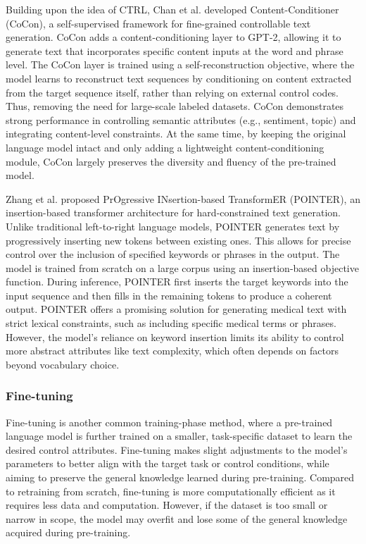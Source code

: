 Building upon the idea of CTRL, Chan et al. \cite{chan2022coconselfsupervisedapproachcontrolled} developed Content-Conditioner (CoCon), a self-supervised framework for fine-grained controllable text generation. 
CoCon adds a content-conditioning layer to GPT-2, allowing it to generate text that incorporates specific content inputs at the word and phrase level. 
The CoCon layer is trained using a self-reconstruction objective, where the model learns to reconstruct text sequences by conditioning on content extracted from the target sequence itself, rather than relying on external control codes.
Thus, removing the need for large-scale labeled datasets.
CoCon demonstrates strong performance in controlling semantic attributes (e.g., sentiment, topic) and integrating content-level constraints.
At the same time, by keeping the original language model intact and only adding a lightweight content-conditioning module, CoCon largely preserves the diversity and fluency of the pre-trained model.

Zhang et al. \cite{zhang-etal-2020-pointer} proposed PrOgressive INsertion-based TransformER (POINTER), an insertion-based transformer architecture for hard-constrained text generation.
Unlike traditional left-to-right language models, POINTER generates text by progressively inserting new tokens between existing ones. 
This allows for precise control over the inclusion of specified keywords or phrases in the output. 
The model is trained from scratch on a large corpus using an insertion-based objective function. 
During inference, POINTER first inserts the target keywords into the input sequence and then fills in the remaining tokens to produce a coherent output.
POINTER offers a promising solution for generating medical text with strict lexical constraints, such as including specific medical terms or phrases. 
However, the model's reliance on keyword insertion limits its ability to control more abstract attributes like text complexity, which often depends on factors beyond vocabulary choice.


\subsubsection{Fine-tuning}
Fine-tuning is another common training-phase method, where a pre-trained language model is further trained on a smaller, task-specific dataset to learn the desired control attributes. 
Fine-tuning makes slight adjustments to the model's parameters to better align with the target task or control conditions, while aiming to preserve the general knowledge learned during pre-training. 
Compared to retraining from scratch, fine-tuning is more computationally efficient as it requires less data and computation.
However, if the dataset is too small or narrow in scope, the model may overfit and lose some of the general knowledge acquired during pre-training.

